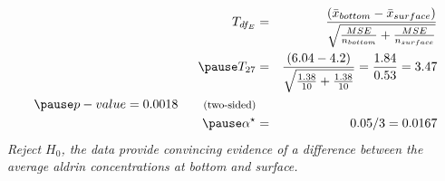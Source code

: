 \documentclass[slidestop,compress,mathserif]{beamer}
\newcommand{\soln}[1]{\textit{#1}}
\begin{document}
\begin{frame}
\frametitle{}


\pause

\soln{
\begin{eqnarray*}
T_{df_E} &=& \frac{(\bar{x}_{bottom} - \bar{x}_{surface})}{\sqrt{ \frac{MSE}{n_{bottom}} + \frac{MSE}{n_{surface}} }} \\ 
\pause
T_{27} &=& \frac{( 6.04 - 4.2 )}{\sqrt{ \frac{1.38}{10} + \frac{1.38}{10} }} = \frac{1.84}{0.53}  =3.47 \\
\pause
p-value = 0.0018 \qquad \text{{\footnotesize (two-sided)}} \\
\pause
\alpha^\star &=& 0.05 / 3 = 0.0167
\end{eqnarray*}
\pause
{\small Reject $H_0$, the data provide convincing evidence of a difference between the average aldrin concentrations at bottom and surface.}
}

\end{frame}




\end{document}
